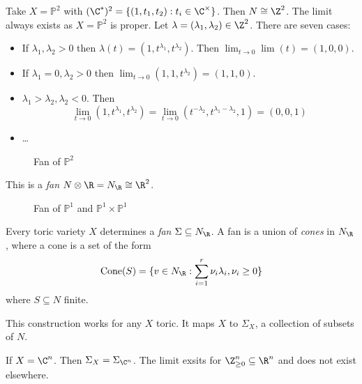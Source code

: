 \documentclass[a4paper]{article}
\renewcommand*{\P}{\mathbb{P}}
\begin{document}
\begin{eg}
  Take \(X = \P^2\) with \((\C^*)^2 = \{(1, t_1, t_2): t_i \in \C^\times\}\). Then \(N \cong \Z^2\). The limit always exists as \(X = \P^2\) is proper. Let \(\lambda = (\lambda_1, \lambda_2) \in \Z^2\). There are seven cases:
  \begin{itemize}
  \item If \(\lambda_1, \lambda_2 > 0\) then \(\lambda(t) = (1, t^{\lambda_1}, t^{\lambda_2})\). Then \(\lim_{t \to 0} \lim(t) = (1, 0, 0)\).
  \item If \(\lambda_1 = 0, \lambda_2 > 0\) then \(\lim_{t \to 0} (1, 1, t^{\lambda_2}) = (1, 1, 0)\).
  \item \(\lambda_1 > \lambda_2, \lambda_2 < 0\). Then
    \[
      \lim_{t \to 0} (1, t^{\lambda_1}, t^{\lambda_2})
      = \lim_{t \to 0} (t^{-\lambda_2}, t^{\lambda_1 - \lambda_2}, 1)
      = (0, 0, 1)
    \]
  \item \dots
  \end{itemize}
  \begin{figure}[ht]
    \centering
    \def\svgwidth{.3\columnwidth}
    
    \caption{Fan of \(\P^2\)}
  \end{figure}
  This is a \emph{fan} \(N \otimes \R = N_\R \cong \R^2\).
\end{eg}

\begin{figure}[ht]
  \centering
  \begin{minipage}{0.5\textwidth}
    \centering
    \def\svgwidth{.8\columnwidth}
    
  \end{minipage}%
  \begin{minipage}{0.5\textwidth}
    \centering
    \def\svgwidth{.8\columnwidth}
    
  \end{minipage}
  \caption{Fan of \(\P^1\) and \(\P^1 \times \P^1\)}
\end{figure}

Every toric variety \(X\) determines a \emph{fan} \(\Sigma \subseteq N_\R\). A fan is a union of \emph{cones} in \(N_\R\), where a cone is a set of the form
\[
  \operatorname{Cone}(S) = \{v \in N_\R: \sum_{i = 1}^r \nu_i \lambda_i, \nu_i \geq 0\}
\]
where \(S \subseteq N\) finite.

This construction works for any \(X\) toric. It maps \(X\) to \(\Sigma_X\), a collection of subsets of \(N\).

\begin{eg}
  If \(X = \C^n\). Then \(\Sigma_X = \Sigma_{\C^n}\). The limit exsits for \(\Z^n_{\geq 0} \subseteq \R^n\) and does not exist elsewhere.
\end{eg}
\end{document}
